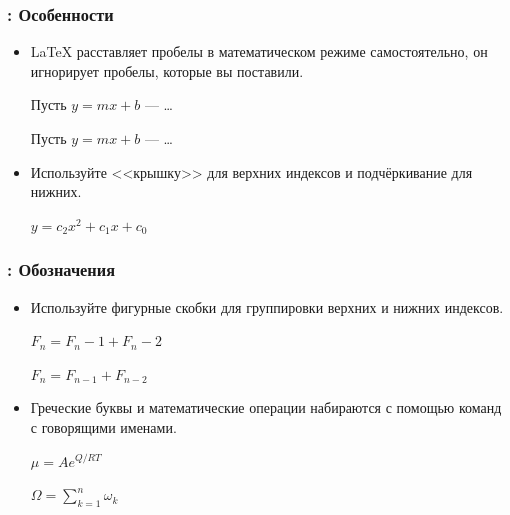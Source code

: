 \documentclass{beamer}
\begin{document}
\begin{frame}[fragile]
\frametitle{\insertsubsection{}: Особенности}
\begin{itemize}
\item \LaTeX{} расставляет пробелы в математическом режиме самостоятельно, он
  игнорирует пробелы, которые вы поставили.

\vspace{2pt}
\begin{exampletwouptiny}
Пусть $y=mx+b$ --- \dots

Пусть $y = m x + b$ --- \dots
\end{exampletwouptiny}

\item Используйте <<крышку>>  для верхних индексов и
  подчёркивание \keystrokebftt{\_} для нижних.

\vspace{2pt}
\begin{exampletwouptiny}
$y = c_2 x^2 + c_1 x + c_0$
\end{exampletwouptiny}
\end{itemize}
\end{frame}

\begin{frame}[fragile]
\frametitle{\insertsubsection{}: Обозначения}
\begin{itemize}
\item Используйте фигурные скобки \keystrokebftt{\{} \keystrokebftt{\}} для
группировки верхних и нижних индексов.

\begin{exampletwouptiny}
$F_n = F_n-1 + F_n-2$ %

$F_n = F_{n-1} + F_{n-2}$
\end{exampletwouptiny}

\item Греческие буквы и математические операции набираются с помощью команд
  с говорящими именами.

\begin{exampletwouptiny}
$\mu = A e^{Q/RT}$

$\Omega =
  \sum_{k=1}^{n} \omega_k$
\end{exampletwouptiny}
\end{itemize}
\end{frame}
\end{document}
